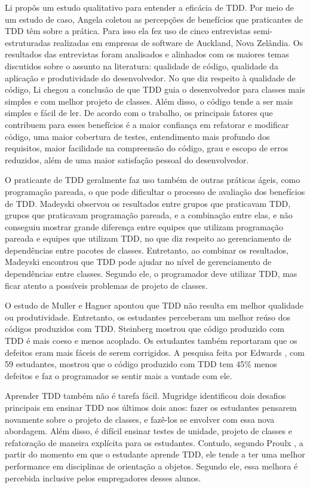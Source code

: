 Li \cite{angela-li} propôs um estudo qualitativo para
entender a eficácia de TDD. Por meio de um estudo de caso, Angela coletou as 
percepções de benefícios que praticantes de TDD têm sobre a prática. Para isso ela
fez uso de cinco entrevistas semi-estruturadas realizadas em empresas de software de 
Auckland, Nova Zelândia. Os resultados das entrevistas foram analisados e alinhados
com os maiores temas discutidos sobre o assunto na literatura: qualidade de código,
qualidade da aplicação e produtividade do desenvolvedor.
No que diz respeito à qualidade de código, Li chegou a conclusão de
que TDD guia o desenvolvedor para classes mais simples e com melhor projeto de classes. 
Além disso, o código tende a ser mais simples e fácil de ler.
De acordo com o trabalho, os principais fatores que contribuem para esses benefícios
é a maior confiança em refatorar e modificar código, uma maior cobertura de testes,
entendimento mais profundo dos requisitos, maior facilidade na compreensão do código,
grau e escopo de erros reduzidos, além de uma maior satisfação pessoal do desenvolvedor.

O praticante de TDD geralmente faz uso também de outras práticas ágeis, como
programação pareada, o que pode dificultar o processo de avaliação dos benefícios
de TDD. Madeyski \cite{madeyski-package-dependencies} observou os resultados
entre grupos que praticavam TDD, grupos que praticavam programação pareada, 
e a combinação entre elas,
e não conseguiu mostrar grande diferença entre equipes que utilizam programação 
pareada e equipes que utilizam TDD, no que diz respeito ao gerenciamento de dependências entre 
pacotes de classes. Entretanto, ao combinar os resultados, Madeyski encontrou que TDD pode 
ajudar no nível de gerenciamento de dependências entre classes. Segundo ele, o 
programador deve utilizar TDD, mas ficar atento a possíveis problemas de projeto de classes.

O estudo de Muller e Hagner \cite{muller-e-hagner} apontou que TDD não resulta
em melhor qualidade ou produtividade. Entretanto, os estudantes perceberam um 
melhor reúso dos códigos produzidos com TDD. Steinberg \cite{steinberg} mostrou
que código produzido com TDD é mais coeso e menos acoplado. Os estudantes também
reportaram que os defeitos eram mais fáceis de serem corrigidos. A pesquisa feita
por Edwards \cite{edwards}, com 59 estudantes, mostrou que o código produzido com
TDD tem 45\% menos defeitos e faz o programador se sentir mais a vontade
com ele.

Aprender TDD também não é tarefa fácil. Mugridge \cite{mugridge} identificou
dois desafios principais em ensinar TDD nos últimos dois anos: fazer os estudantes
pensarem novamente sobre o projeto de classes, e fazê-los se envolver com essa nova
abordagem. Além disso, é difícil ensinar testes de unidade, projeto de classes e refatoração
de maneira explícita para os estudantes. Contudo, segundo Proulx \cite{proulx}, a partir do momento em que
o estudante aprende TDD, ele tende a ter uma melhor performance em disciplinas
de orientação a objetos. Segundo ele, essa melhora é percebida inclusive pelos
empregadores desses alunos. 

